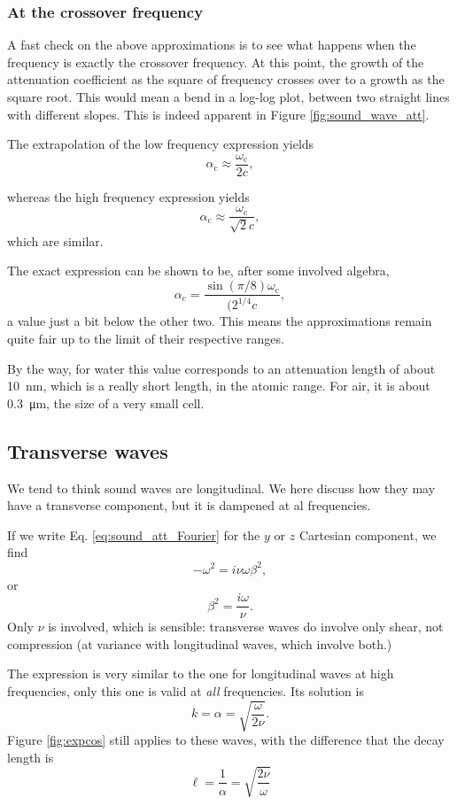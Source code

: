 \subsubsection{At the crossover frequency}

A fast check on the above approximations is to see what happens when
the frequency is exactly the crossover frequency. At this point, the
growth of the attenuation coefficient as the square of frequency
crosses over to a growth as the square root. This would mean a bend in
a log-log plot, between two straight lines with different slopes. This
is indeed apparent in Figure \ref{fig:sound_wave_att}.

The extrapolation of the low frequency expression yields
\[
\alpha_\mathrm{c}\approx \frac{\omega_\mathrm{c}}{2 c} ,
\]

whereas the high frequency expression yields
\[
\alpha_\mathrm{c}\approx \frac{\omega_\mathrm{c}}{\sqrt{2} c} ,
\]
which are similar.

The exact expression can be shown to be, after some involved algebra,
\[
\alpha_\mathrm{c} =\frac{ \sin(\pi/8) \omega_\mathrm{c} }{ (2^{1/4} c } ,
\]
a value just a bit below the other two. This means the approximations
remain quite fair up to the limit of their respective ranges.

By the way, for water this value corresponds to an attenuation length
of about \SI{10}{\nano\meter}, which is a really short length, in the
atomic range. For air, it is about \SI{0.3}{\micro\meter}, the size of
a very small cell.

\subsection{Transverse waves}

We tend to think sound waves are longitudinal. We here discuss how
they may have a transverse component, but it is dampened at al
frequencies.

If we write Eq. \ref{eq:sound_att_Fourier} for the $y$ or $z$
Cartesian component, we find
\[
-\omega^2 =  i \nu \omega \beta^2 ,
\]
or
\[
\beta^2 = \frac{i \omega}{\nu}.
\]
Only $\nu$ is involved, which is sensible: transverse waves do involve
only shear, not compression (at variance with longitudinal waves,
which involve both.)

The expression is very similar to the one for longitudinal waves at
high frequencies, only this one is valid at \emph{all} frequencies.
Its solution is
\[
k = \alpha = \sqrt{ \frac{\omega}{ 2 \nu}}.
\]
Figure \ref{fig:expcos} still applies to these waves, with the
difference that the decay length is
\[
\ell= \frac{1}{\alpha}=\sqrt{\frac{ 2 \nu}{\omega}}
\]

